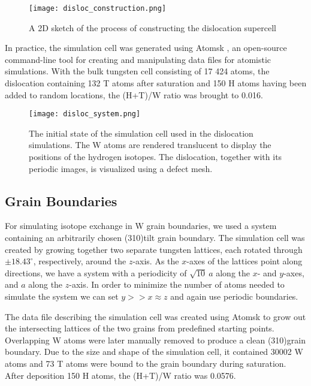 \begin{figure}[!ht]
\center
\texttt{[image: disloc\_construction.png]}
\caption{A 2D sketch of the process of constructing the dislocation supercell}
\label{Fig:disloc_construction}
\end{figure}

In practice, the simulation cell was generated using Atomsk \cite{hirel2015atomsk}, an open-source command-line tool for creating and manipulating data files for atomistic simulations.
With the bulk tungsten cell consisting of 17 424 atoms, the dislocation containing 132 T atoms after saturation and 150 H atoms having been added to random locations, the (H+T)/W ratio was brought to 0.016. 

\begin{figure}[!ht]
\center
\texttt{[image: disloc\_system.png]}
\caption{The initial state of the simulation cell used in the dislocation simulations. 
The W atoms are rendered translucent to display the positions of the hydrogen isotopes. 
The dislocation, together with its periodic images, is visualized using a defect mesh.}
\label{Fig:disloc_system}
\end{figure}

\subsection{Grain Boundaries}
For simulating isotope exchange in W grain boundaries, we used a system containing an arbitrarily chosen \hkl(310)\hkl[001] tilt grain boundary. 
The simulation cell was created by growing together two separate tungsten lattices, each rotated through $\pm18.43^\circ$, respectively, around the $z$-axis. 
As the $x$-axes of the lattices point along  directions, we have a system with a periodicity of $\sqrt{10}~a$ along the $x$- and $y$-axes, and $a$ along the $z$-axis. 
In order to minimize the number of atoms needed to simulate the system we can set $y >> x \approx z$ and again use periodic boundaries.


The data file describing the simulation cell was created using Atomsk \cite{hirel2015atomsk} to grow out the intersecting lattices of the two grains from predefined starting points. 
Overlapping W atoms were later manually removed to produce a clean \hkl(310)\hkl[001] grain boundary.
Due to the size and shape of the simulation cell, it contained 30002 W atoms and 73 T atoms were bound to the grain boundary during saturation.
After deposition 150 H atoms, the (H+T)/W ratio was 0.0576.

